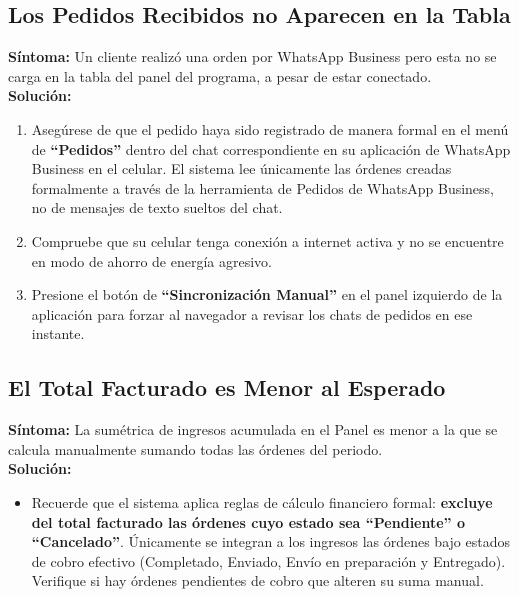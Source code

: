 \documentclass[11pt,a4paper]{article}
\begin{document}
\subsection{Los Pedidos Recibidos no Aparecen en la Tabla}
\textbf{Síntoma:} Un cliente realizó una orden por WhatsApp Business pero esta no se carga en la tabla del panel del programa, a pesar de estar conectado.\\
\textbf{Solución:}
\begin{enumerate}
    \item Asegúrese de que el pedido haya sido registrado de manera formal en el menú de \textbf{``Pedidos''} dentro del chat correspondiente en su aplicación de WhatsApp Business en el celular. El sistema lee únicamente las órdenes creadas formalmente a través de la herramienta de Pedidos de WhatsApp Business, no de mensajes de texto sueltos del chat.
    \item Compruebe que su celular tenga conexión a internet activa y no se encuentre en modo de ahorro de energía agresivo.
    \item Presione el botón de \textbf{``Sincronización Manual''} en el panel izquierdo de la aplicación para forzar al navegador a revisar los chats de pedidos en ese instante.
\end{enumerate}

\subsection{El Total Facturado es Menor al Esperado}
\textbf{Síntoma:} La sumétrica de ingresos acumulada en el Panel es menor a la que se calcula manualmente sumando todas las órdenes del periodo.\\
\textbf{Solución:}
\begin{itemize}
    \item Recuerde que el sistema aplica reglas de cálculo financiero formal: \textbf{excluye del total facturado las órdenes cuyo estado sea ``Pendiente'' o ``Cancelado''}. Únicamente se integran a los ingresos las órdenes bajo estados de cobro efectivo (Completado, Enviado, Envío en preparación y Entregado). Verifique si hay órdenes pendientes de cobro que alteren su suma manual.
\end{itemize}
\end{document}
